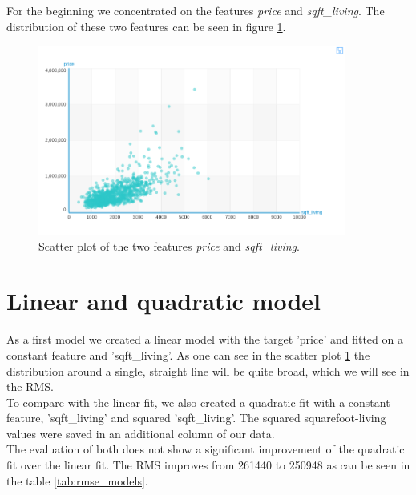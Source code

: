 \documentclass[12pt]{scrreprt}
\begin{document}
\noindent
For the beginning we concentrated on the features \textit{price} and \textit{sqft\_living}. The distribution of these two features can be seen in figure \ref{fig:scatter}.\\

\begin{figure}[H]
\begin{center}
\includegraphics[width=0.9\textwidth, angle=0]{scatter_sqft_living_price.png}
\caption{Scatter plot of the two features \textit{price} and \textit{sqft\_living}.}
\label{fig:scatter}
\end{center}
\end{figure}

\section{Linear and quadratic model} 

As a first model we created a linear model with the target 'price' and fitted on a constant feature and 'sqft\_living'. As one can see in the scatter plot \ref{fig:scatter} the distribution around a single, straight line will be quite broad, which we will see in the RMS.\\

To compare with the linear fit, we also created a quadratic fit with a constant feature, 'sqft\_living' and squared 'sqft\_living'. The squared squarefoot-living values were saved in an additional column of our data.\\

The evaluation of both does not show a significant improvement of the quadratic fit over the linear fit. The RMS improves from 261440 to 250948 as can be seen in the table \ref{tab:rmse_models}.\\
\end{document}
